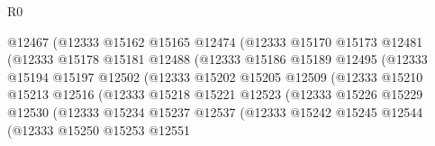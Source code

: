 \begin{lexlean}{R0}
\begin{coremodule}
                                  @12467
                                  (@12333
                                    @15162
                                    @15165
                                    @12474
                                    (@12333
                                      @15170
                                      @15173
                                      @12481
                                      (@12333
                                        @15178
                                        @15181
                                        @12488
                                        (@12333
                                          @15186
                                          @15189
                                          @12495
                                          (@12333
                                            @15194
                                            @15197
                                            @12502
                                            (@12333
                                              @15202
                                              @15205
                                              @12509
                                              (@12333
                                                @15210
                                                @15213
                                                @12516
                                                (@12333
                                                  @15218
                                                  @15221
                                                  @12523
                                                  (@12333
                                                    @15226
                                                    @15229
                                                    @12530
                                                    (@12333
                                                      @15234
                                                      @15237
                                                      @12537
                                                      (@12333
                                                        @15242
                                                        @15245
                                                        @12544
                                                        (@12333
                                                          @15250
                                                          @15253
                                                          @12551

\end{coremodule}
\end{lexlean}
